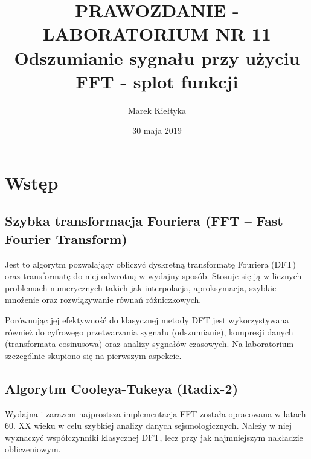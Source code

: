 

\renewcommand{\arraystretch}{1.2}

\title{\Large\vspace{-2.5cm}{\Huge S}PRAWOZDANIE - LABORATORIUM NR {\Huge11}\\
	\textbf{Odszumianie sygnału przy użyciu FFT - splot funkcji} } 
\date{\Large30 maja 2019}
\author{\Large Marek Kiełtyka}


\maketitle

\vspace{-1.2cm}\section{Wstęp}

\subsection{Szybka transformacja Fouriera (FFT – Fast Fourier Transform)}

Jest to algorytm pozwalający obliczyć dyskretną transformatę Fouriera (DFT) oraz transformatę do niej odwrotną w wydajny sposób. Stosuje się ją w licznych problemach numerycznych takich jak interpolacja, aproksymacja, szybkie mnożenie oraz rozwiązywanie równań różniczkowych. 

Porównując jej efektywność do klasycznej metody DFT jest wykorzystywana również do cyfrowego przetwarzania sygnału (odszumianie), kompresji danych (transformata cosinusowa) oraz analizy sygnałów czasowych. Na laboratorium szczególnie skupiono się na pierwszym aspekcie.

\subsection{Algorytm Cooleya-Tukeya (Radix-2)}

Wydajna i zarazem najprostsza implementacja FFT została opracowana w latach 60. XX wieku w celu szybkiej analizy danych sejsmologicznych. Należy w niej wyznaczyć współczynniki klasycznej DFT, lecz przy jak najmniejszym nakładzie obliczeniowym.


